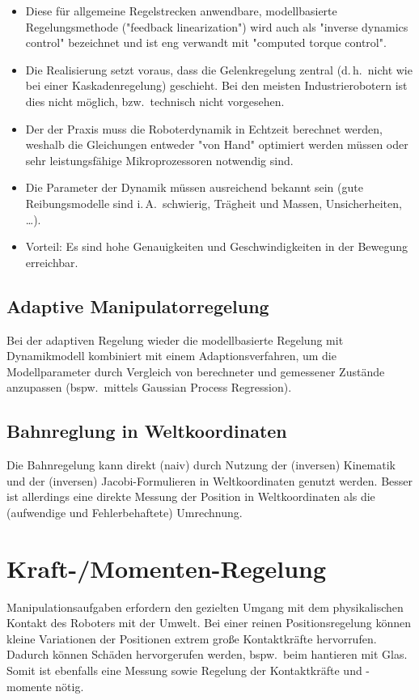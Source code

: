 \documentclass[a4paper, 11pt, accentcolor = tud3b]{tudreport}
\renewcommand{\dh}{d.\,h.~}
\newcommand{\bzw}{bzw.~}
\newcommand{\bspw}{bspw.~}
\newcommand{\iA}{i.\,A.~}
\begin{document}
				\begin{itemize}
					\item Diese für allgemeine Regelstrecken anwendbare, modellbasierte Regelungsmethode ("feedback linearization") wird auch als "inverse dynamics control" bezeichnet und ist eng verwandt mit "computed torque control".
					\item Die Realisierung setzt voraus, dass die Gelenkregelung zentral (\dh nicht wie bei einer Kaskadenregelung) geschieht. Bei den meisten Industrierobotern ist dies nicht möglich, \bzw technisch nicht vorgesehen.
					\item Der der Praxis muss die Roboterdynamik in Echtzeit berechnet werden, weshalb die Gleichungen entweder "von Hand" optimiert werden müssen oder sehr leistungsfähige Mikroprozessoren notwendig sind.
					\item Die Parameter der Dynamik müssen ausreichend bekannt sein (gute Reibungsmodelle sind \iA schwierig, Trägheit und Massen, Unsicherheiten, \dots).
					\item Vorteil: Es sind hohe Genauigkeiten und Geschwindigkeiten in der Bewegung erreichbar.
				\end{itemize}

			\subsection{Adaptive Manipulatorregelung}
				Bei der adaptiven Regelung wieder die modellbasierte Regelung mit Dynamikmodell kombiniert mit einem Adaptionsverfahren, um die Modellparameter durch Vergleich von berechneter und gemessener Zustände anzupassen (\bspw mittels Gaussian Process Regression).

			\subsection{Bahnreglung in Weltkoordinaten}
				Die Bahnregelung kann direkt (naiv) durch Nutzung der (inversen) Kinematik und der (inversen) Jacobi-Formulieren in Weltkoordinaten genutzt werden. Besser ist allerdings eine direkte Messung der Position in Weltkoordinaten als die (aufwendige und Fehlerbehaftete) Umrechnung.

		\section{Kraft-/Momenten-Regelung} %
			Manipulationsaufgaben erfordern den gezielten Umgang mit dem physikalischen Kontakt des Roboters mit der Umwelt. Bei einer reinen Positionsregelung können kleine Variationen der Positionen extrem große Kontaktkräfte hervorrufen. Dadurch können Schäden hervorgerufen werden, \bspw beim hantieren mit Glas. Somit ist ebenfalls eine Messung sowie Regelung der Kontaktkräfte und -momente nötig.
			
\end{document}
